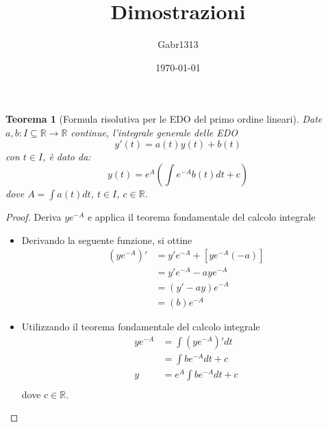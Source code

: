 \documentclass[12pt, a4paper]{article}
\title{Dimostrazioni}
\author{Gabr1313}
\date{\today}
\theoremstyle{break}
\newtheorem{theorem}{Teorema} %
\begin{document}
\justify
\sloppy
\maketitle
\listoftheorems

\newpage
{}
\begin{theorem} [Formula risolutiva per le EDO del primo ordine lineari]
	Date $a, b: I \subseteq \mathbb{R} \to \mathbb{R}$ continue,
	l'integrale generale delle EDO
	\[
		y'(t) = a(t) y(t) + b(t)
	\]
	con $t \in I $, è dato da:
	\[
		y(t) = e^A \left( \int e^{-A} b(t) dt + c \right)
	\]
	dove $A = \int a(t) dt$, $t \in I$, $c \in \mathbb{R}$.
\end{theorem}
\begin{proof} Deriva $y e^{-A}$ e applica il teorema fondamentale del calcolo
	integrale
	\begin{itemize}
		\item Derivando la seguente funzione, si ottine
			\begin{align*}
				(y e^{-A})' & = y' e^{-A} + [ye^{-A}(-a)] \\
				            & = y' e^{-A} - aye^{-A}      \\
				            & = (y' - ay)e^{-A}           \\
				            & = (b)e^{-A}
			\end{align*}
		\item Utilizzando il teorema fondamentale del calcolo integrale
			\begin{align*}
				y e^{-A} & = \int (y e^{-A})' dt     \\
				         & = \int be^{-A} dt + c     \\
				y        & = e^A \int be^{-A} dt + c \\
			\end{align*}
			dove $c \in \mathbb{R}$.
	\end{itemize}
\end{proof}
\end{document}
